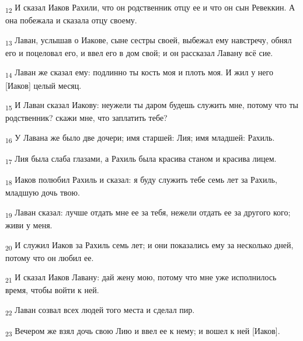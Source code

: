 \begin{tcolorbox}
\textsubscript{12} И сказал Иаков Рахили, что он родственник отцу ее и что он сын Ревеккин. А она побежала и сказала отцу своему.
\end{tcolorbox}
\begin{tcolorbox}
\textsubscript{13} Лаван, услышав о Иакове, сыне сестры своей, выбежал ему навстречу, обнял его и поцеловал его, и ввел его в дом свой; и он рассказал Лавану всё сие.
\end{tcolorbox}
\begin{tcolorbox}
\textsubscript{14} Лаван же сказал ему: подлинно ты кость моя и плоть моя. И жил у него [Иаков] целый месяц.
\end{tcolorbox}
\begin{tcolorbox}
\textsubscript{15} И Лаван сказал Иакову: неужели ты даром будешь служить мне, потому что ты родственник? скажи мне, что заплатить тебе?
\end{tcolorbox}
\begin{tcolorbox}
\textsubscript{16} У Лавана же было две дочери; имя старшей: Лия; имя младшей: Рахиль.
\end{tcolorbox}
\begin{tcolorbox}
\textsubscript{17} Лия была слаба глазами, а Рахиль была красива станом и красива лицем.
\end{tcolorbox}
\begin{tcolorbox}
\textsubscript{18} Иаков полюбил Рахиль и сказал: я буду служить тебе семь лет за Рахиль, младшую дочь твою.
\end{tcolorbox}
\begin{tcolorbox}
\textsubscript{19} Лаван сказал: лучше отдать мне ее за тебя, нежели отдать ее за другого кого; живи у меня.
\end{tcolorbox}
\begin{tcolorbox}
\textsubscript{20} И служил Иаков за Рахиль семь лет; и они показались ему за несколько дней, потому что он любил ее.
\end{tcolorbox}
\begin{tcolorbox}
\textsubscript{21} И сказал Иаков Лавану: дай жену мою, потому что мне уже исполнилось время, чтобы войти к ней.
\end{tcolorbox}
\begin{tcolorbox}
\textsubscript{22} Лаван созвал всех людей того места и сделал пир.
\end{tcolorbox}
\begin{tcolorbox}
\textsubscript{23} Вечером же взял дочь свою Лию и ввел ее к нему; и вошел к ней [Иаков].
\end{tcolorbox}
